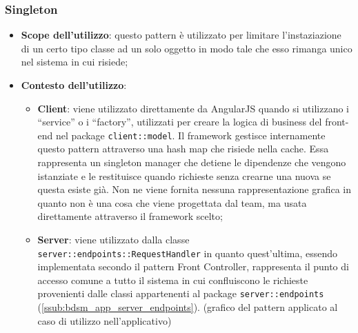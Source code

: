 	\subsubsection{Singleton} %
	\label{ssub:singleton}
		\begin{itemize}
			\item \textbf{Scope dell'utilizzo}: questo pattern è utilizzato per limitare l'instaziazione di un certo tipo classe ad un solo oggetto in modo tale che esso rimanga unico nel sistema in cui risiede;
			\item \textbf{Contesto dell'utilizzo}:
				\begin{itemize}
					\item \textbf{Client}: viene utilizzato direttamente da AngularJS quando si utilizzano i ``service'' o i ``factory'', utilizzati per creare la logica di business del front-end nel package \texttt{client::model}. Il framework gestisce internamente questo pattern attraverso una hash map che risiede nella cache. Essa rappresenta un singleton manager che detiene le dipendenze che vengono istanziate e le restituisce quando richieste senza crearne una nuova se questa esiste già. \newline
					Non ne viene fornita nessuna rappresentazione grafica in quanto non è una cosa che viene progettata dal team, ma usata direttamente attraverso il framework scelto;
					\item \textbf{Server}: viene utilizzato dalla classe \texttt{server::endpoints::RequestHandler} in quanto quest'ultima, essendo implementata secondo il pattern Front Controller, rappresenta il punto di accesso comune a tutto il sistema in cui confluiscono le richieste provenienti dalle classi appartenenti al package \texttt{server::endpoints} (\ref{ssub:bdsm_app_server_endpoints}). \newline
					[TO DO] (grafico del pattern applicato al caso di utilizzo nell'applicativo)
				\end{itemize}
		\end{itemize}
